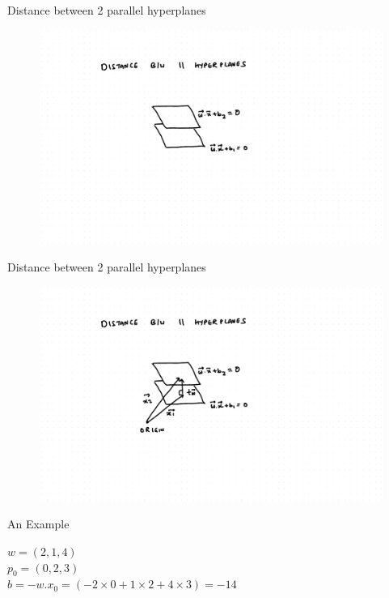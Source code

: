 \documentclass{beamer}
\begin{document}
\begin{frame}{Distance between 2 parallel hyperplanes}

\begin{figure}
\includegraphics[scale=0.5]{SVM/Svm-17.pdf}
\end{figure}

\end{frame}

\begin{frame}{Distance between 2 parallel hyperplanes}

\begin{figure}
\includegraphics[scale=0.5]{SVM/Svm-18.pdf}
\end{figure}

\end{frame}

\begin{frame}{An Example}

$w = (2,1,4)$\\
$p_{0} = (0,2,3)$\\
$b = -w.x_{0} = (-2 \times 0 + 1 \times 2 + 4 \times 3) = -14$\\

\end{frame}
\end{document}
